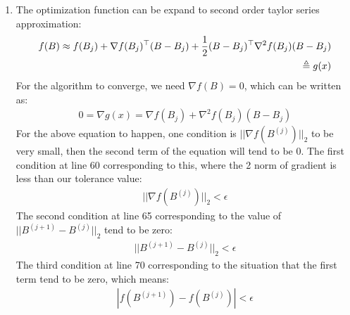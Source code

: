 \documentclass[12pt,twoside]{article}
\begin{document}
\begin{enumerate}[1)]
\item
The optimization function can be expand to second order taylor series approximation:
\begin{align}
f(B) \approx f(B_j) + \nabla f(B_j)^\top(B-B_j) + \frac{1}{2}(B-B_j)^\top\nabla^2 f(B_j)(B-B_j)\\
\triangleq g(x)
\end{align}
For the algorithm to converge, we need $\nabla f(B) = 0$, which can be written as:
\begin{align}
0 = \nabla g(x) = \nabla f(B_j) + \nabla^2 f(B_j)(B-B_j)
\end{align}
For the above equation to happen, one condition is $||\nabla f(B^{(j)})||_2$ to be very small, then the second term of the equation will tend to be 0.
The first condition at line 60 corresponding to this, where the 2 norm of gradient is less than our tolerance value:
\begin{align}
||\nabla f(B^{(j)})||_2 < \epsilon
\end{align}
The second condition at line 65 corresponding to the value of $||B^{(j+1)} - B^{(j)}||_2$ tend to be zero:
\begin{align}
||B^{(j+1)} - B^{(j)}||_2 < \epsilon
\end{align}
The third condition at line 70 corresponding to the situation that the first term tend to be zero, which means:
\begin{align}
|f(B^{(j+1)}) - f(B^{(j)})| < \epsilon
\end{align}


\end{enumerate}
\end{document}
